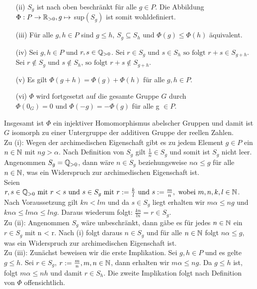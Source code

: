 {\begin{enumerate}
\item[(ii)] $S_g$ ist nach oben beschränkt für alle $g \in P$. Die Abbildung $\Phi: P \rightarrow \mathbb{R}_{>0}, g \mapsto$ sup$\left( S_g \right)$ ist somit wohldefiniert.  
\item[(iii)]Für alle $g, h \in P$ sind $g \le h $, $ S_g \subseteq S_h$ und $\Phi(g) \le \Phi(h)$ äquivalent.  
\item[(iv)] Sei $g, h \in P$ und $r,s \in \mathbb{Q}_{>0}$. Sei $r \in S_g \text{ und } s \in S_h \text{ so folgt } r+s \in S_{g+h}$. \\
Sei $r \notin S_g \text{ und } s \notin S_h \text{, so folgt } r+s \notin S_{g+h}$. 
\item[(v)] Es gilt $\Phi\left( g+h\right) = \Phi\left(g\right) + \Phi\left(h\right)$ für alle $g, h \in P$. 
\item[(vi)] $\Phi$ wird fortgesetzt auf die gesamte Gruppe $G$ durch $\Phi\left(0_G\right) = 0 \text{ und } \Phi \left(-g\right) = -\Phi \left(g\right)$ für alle g $\in P$. \\ 
\end{enumerate}
Insgesamt ist $\Phi$ ein injektiver Homomorphismus abelscher Gruppen und damit ist $G$ isomorph zu einer Untergruppe der additiven Gruppe der reellen Zahlen.\\ 
Zu (i): Wegen der archimedischen Eigenschaft gibt es zu jedem Element $g \in P$ ein $n \in \mathbb{N}$ mit $ng > \alpha$. Nach Definition von $S_g$ gilt $\frac{1}{n} \in S_g$ und somit ist $S_g$ nicht leer.\\ Angenommen $S_g = \mathbb{Q}_{>0}$, dann wäre $n \in S_g$ beziehungsweise $n\alpha \le g$ für alle $n\in\mathbb{N}$, was ein Widerspruch zur archimedischen Eigenschaft ist.\\
Seien $r, s \in \mathbb{Q}_{>0} \text{ mit } r < s \text{ und } s \in S_g \text { mit } r := \frac{k}{l} \text{ und } s:= \frac{m}{n}, \text{ wobei } m, n ,k, l \in \mathbb{N}$. Nach Voraussetzung gilt $kn < lm $ und da $s \in S_g$ liegt erhalten wir $ m\alpha \le ng$ und $kn\alpha \le lm\alpha \le lng.$ Daraus wiederum folgt: $\frac{kn}{ln} = r \in S_g$.\\
%
%
% 
%
Zu (ii): Angenommen $S_g$ wäre unbeschränkt, dann gäbe es für jedes $n \in \mathbb{N}$ ein $r \in S_g$ mit n < r. Nach (i) folgt daraus $n \in S_g$ und für alle $n \in \mathbb{N}$ folgt $ n\alpha \le g$, was ein Widerspruch zur archimedischen Eigenschaft ist.\\
%
%
%
%
%
Zu (iii): Zunächst beweisen wir die erste Implikation. Sei  $g, h \in P$ und es gelte $g \le h$. Sei $r \in S_g$, $r:= \frac{m}{n}, m, n \in \mathbb{N} $, dann erhalten wir $m\alpha \le ng$. Da $g \le h$ ist, folgt $ m\alpha \le n h$ und damit $r \in S_h$. Die zweite Implikation folgt nach Definition von $\Phi$ offensichtlich.\\
}
